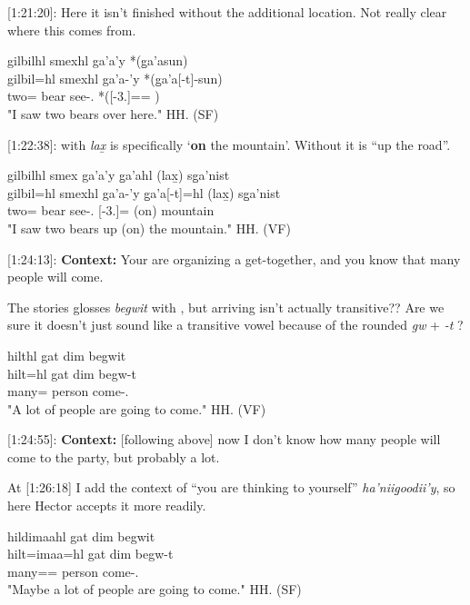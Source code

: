 [1:21:20]: Here it isn't finished without the additional location. Not really clear where this comes from.

\begin{exe}
    \ex \glll
    gilbilhl smexhl ga'a'y *(g̱a'asun) \\
    gilbil=hl smexhl ga'a-'y *(g̱a'a[-t]-sun) \\
    two=\Cn{} bear see-\Fsg{}.\Ii{} *(\Loc{}[-3.\Ii{}]=\Pn{}=\Demprox{} ) \\
    \glt "I saw two bears over here."  \hfill HH.\ElicitationDate{} (SF)
\end{exe}

[1:22:38]: with \textit{lax̱} is specifically `\textbf{on} the mountain'. Without it is ``up the road''.

\begin{exe}
    \ex \glll
    gilbilhl smex ga'a'y g̱a'ahl (lax̱) sg̱a'nist\\
    gilbil=hl smexhl ga'a-'y g̱a'a[-t]=hl (lax̱) sg̱a'nist \\
    two=\Cn{} bear see-\Fsg{}.\Ii{} \Loc{}[-3.\Ii{}]=\Cn{} (on) mountain \\
    \glt "I saw two bears up (on) the mountain."  \hfill HH.\ElicitationDate{} (VF)
\end{exe}

[1:24:13]: \textbf{Context:} Your are organizing a get-together, and you know that many people will come.

The stories glosses \textit{begwit} with \Tr{}, but arriving isn't actually transitive?? Are we sure it doesn't just sound like a transitive vowel because of the rounded \textit{gw} + \textit{-t} ?

\begin{exe}
    \ex \glll
    hilthl gat dim begwit \\
    hilt=hl gat dim begw-t \\
    many=\Cn{} person \Prosp{} come-\Tsg{}.\Ii{} \\
    \glt "A lot of people are going to come." \hfill HH.\ElicitationDate{} (VF)
\end{exe}

[1:24:55]: \textbf{Context:} [following above] now I don't know how many people will come to the party, but probably a lot.

At [1:26:18] I add the context of ``you are thinking to yourself'' \textit{ha'niig̱oodii'y}, so here Hector accepts it more readily.

\begin{exe}
    \ex \glll
    hildimaahl gat dim begwit \\
    hilt=imaa=hl gat dim begw-t \\
    many=\Epis{}=\Cn{} person \Prosp{} come-\Tsg{}.\Ii{} \\
    \glt "Maybe a lot of people are going to come." \hfill HH.\ElicitationDate{} (SF)
\end{exe}

